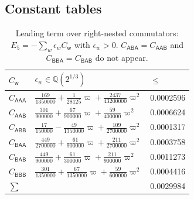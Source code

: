 \documentclass[11pt]{article}
\newcommand{\Qc}{\mathbb{Q}(2^{1/3})}
\newcommand{\C}[1]{C_{\mathsf{#1}}}
\theoremstyle{plain}
\theoremstyle{definition}
\theoremstyle{remark}
\begin{document}
\begin{appendices}
\section{Constant tables}\label{app:tables}

\begin{table}[ht]
\centering\small
\caption{Leading term over right-nested commutators: $E_5=-\sum_w\epsilon_w\C w$ with $\epsilon_w>0$.
$\C{ABA}=\C{AAB}$ and $\C{BBA}=\C{BAB}$ do not appear.}\label{tab:E5}
\begin{tabular}{@{}lll@{}}
\toprule
$\C w$ & $\epsilon_w\in\Qc$ & $\le$\\
\midrule
$\C{AAA}$ & $\tfrac{169}{1350000}+\tfrac{1}{28125}\varpi+\tfrac{2437}{43200000}\varpi^2$ & 0.0002596\\
$\C{AAB}$ & $\tfrac{301}{900000}+\tfrac{67}{900000}\varpi+\tfrac{59}{400000}\varpi^2$ & 0.0006624\\
$\C{ABB}$ & $\tfrac{17}{150000}-\tfrac{49}{1350000}\varpi+\tfrac{109}{2700000}\varpi^2$ & 0.0001317\\
$\C{BAA}$ & $\tfrac{449}{2700000}+\tfrac{61}{900000}\varpi+\tfrac{211}{2700000}\varpi^2$ & 0.0003758\\
$\C{BAB}$ & $\tfrac{449}{900000}+\tfrac{61}{300000}\varpi+\tfrac{211}{900000}\varpi^2$ & 0.0011273\\
$\C{BBB}$ & $\tfrac{301}{1350000}+\tfrac{67}{1350000}\varpi+\tfrac{59}{600000}\varpi^2$ & 0.0004416\\
\midrule
$\sum$ & & 0.0029984\\
\bottomrule
\end{tabular}
\end{table}


\end{appendices}
\end{document}
